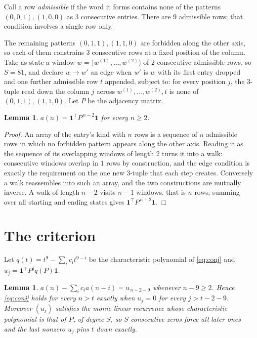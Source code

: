 \documentclass[11pt,a4paper]{article}
\theoremstyle{plain}
\newtheorem{lemma}[theorem]{Lemma}
\theoremstyle{definition}
\begin{document}
Call a row \emph{admissible} if the word it forms contains none of the patterns
$(0,0,1), (1,0,0)$ as $3$ consecutive entries. There are $9$ admissible rows; that condition
involves a single row only.

The remaining patterns $(0,1,1), (1,1,0)$ are forbidden along the other axis, so each of them
constrains $3$ consecutive rows at a fixed position of the column. Take as state a
window $w=\bigl(w^{(1)},\dots,w^{(2)}\bigr)$ of $2$ consecutive admissible
rows, so $S=81$, and declare $w\to w'$ an edge when $w'$ is $w$ with its first entry
dropped and one further admissible row $t$ appended, subject to: for every position
$j$, the $3$-tuple read down the column $j$ across $w^{(1)},\dots,w^{(2)},t$
is none of $(0,1,1), (1,1,0)$. Let $P$ be the adjacency matrix.

\begin{lemma}\label{lem:walk}
$a(n)=\mathbf{1}^{\!\top}P^{\,n-2}\mathbf{1}$ for every $n\ge2$.
\end{lemma}

\begin{proof}
An array of the entry's kind with $n$ rows is a sequence of $n$ admissible rows in
which no forbidden pattern appears along the other axis. Reading it as the sequence of its
overlapping windows of length $2$ turns it into a walk: consecutive windows overlap in
$1$ rows by construction, and the edge condition is exactly the requirement on the one
new $3$-tuple that each step creates. Conversely a walk reassembles into such an array,
and the two constructions are mutually inverse. A walk of length $n-2$ visits $n-1$
windows, that is $n$ rows; summing over all starting and ending states gives
$\mathbf{1}^{\!\top}P^{\,n-2}\mathbf{1}$.
\end{proof}

\section{The criterion}

Let $q(t)=t^{9}-\sum_i c_i t^{9-i}$ be the characteristic polynomial of
\eqref{eq:conj} and $u_j=\mathbf{1}^{\!\top}P^{j}q(P)\mathbf{1}$.

\begin{lemma}\label{lem:crit}
$a(n)-\sum_i c_i a(n-i)=u_{\,n-2-9}$ whenever $n-9\ge2$. Hence
\eqref{eq:conj} holds for every $n>t$ exactly when $u_j=0$ for every
$j>t-2-9$. Moreover $(u_j)$ satisfies the monic linear recurrence whose
characteristic polynomial is that of $P$, of degree $S$, so $S$ consecutive zeros force all
later ones and the last nonzero $u_j$ pins $t$ down exactly.
\end{lemma}
\end{document}
